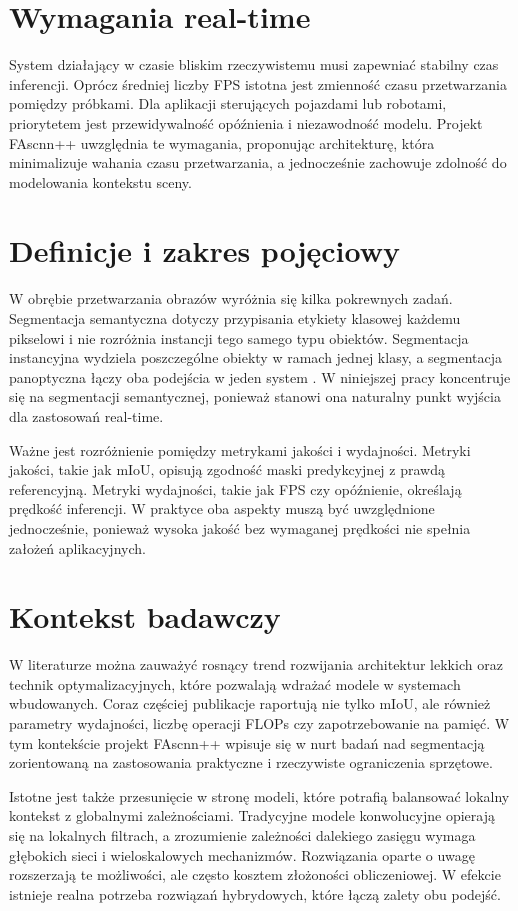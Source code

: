 \documentclass[12pt,oneside,a4paper]{report}
\begin{document}
\section{Wymagania real-time}
System działający w czasie bliskim rzeczywistemu musi zapewniać stabilny czas
inferencji. Oprócz średniej liczby FPS istotna jest zmienność czasu
przetwarzania pomiędzy próbkami. Dla aplikacji sterujących pojazdami lub
robotami, priorytetem jest przewidywalność opóźnienia i niezawodność modelu.
Projekt FAscnn++ uwzględnia te wymagania, proponując architekturę, która minimalizuje
wahania czasu przetwarzania, a jednocześnie zachowuje zdolność do modelowania
kontekstu sceny.

\section{Definicje i zakres pojęciowy}
W obrębie przetwarzania obrazów wyróżnia się kilka pokrewnych zadań. Segmentacja
semantyczna dotyczy przypisania etykiety klasowej każdemu pikselowi i nie
rozróżnia instancji tego samego typu obiektów. Segmentacja instancyjna
wydziela poszczególne obiekty w ramach jednej klasy, a segmentacja panoptyczna
łączy oba podejścia w jeden system \parencite{he2017maskrcnn,kirillov2019panoptic}.
W niniejszej pracy koncentruje się na segmentacji semantycznej, ponieważ stanowi
ona naturalny punkt wyjścia dla zastosowań real-time.

Ważne jest rozróżnienie pomiędzy metrykami jakości i wydajności. Metryki
jakości, takie jak mIoU, opisują zgodność maski predykcyjnej z prawdą
referencyjną. Metryki wydajności, takie jak FPS czy opóźnienie, określają
prędkość inferencji. W praktyce oba aspekty muszą być uwzględnione jednocześnie,
ponieważ wysoka jakość bez wymaganej prędkości nie spełnia założeń aplikacyjnych.

\section{Kontekst badawczy}
W literaturze można zauważyć rosnący trend rozwijania architektur lekkich oraz
technik optymalizacyjnych, które pozwalają wdrażać modele w systemach
wbudowanych. Coraz częściej publikacje raportują nie tylko mIoU, ale również
parametry wydajności, liczbę operacji FLOPs czy zapotrzebowanie na pamięć.
W tym kontekście projekt FAscnn++ wpisuje się w nurt badań nad segmentacją
zorientowaną na zastosowania praktyczne i rzeczywiste ograniczenia sprzętowe.

Istotne jest także przesunięcie w stronę modeli, które potrafią balansować
lokalny kontekst z globalnymi zależnościami. Tradycyjne modele konwolucyjne
opierają się na lokalnych filtrach, a zrozumienie zależności dalekiego zasięgu
wymaga głębokich sieci i wieloskalowych mechanizmów. Rozwiązania oparte o uwagę
rozszerzają te możliwości, ale często kosztem złożoności obliczeniowej.
W efekcie istnieje realna potrzeba rozwiązań hybrydowych, które łączą zalety
obu podejść.
\end{document}
